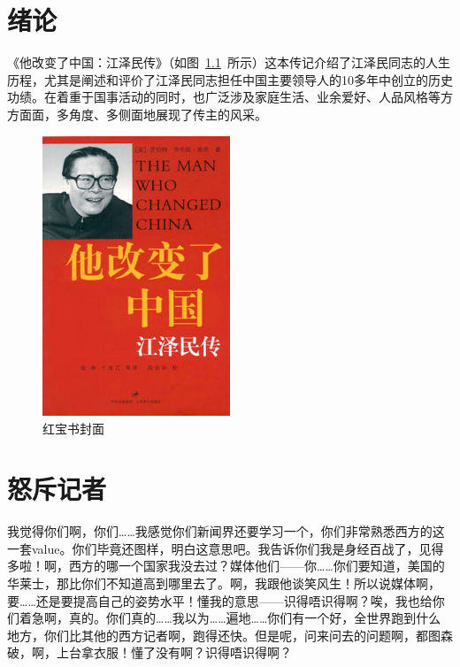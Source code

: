 
\chapter{绪论}
《他改变了中国：江泽民传》（如图~\ref{book}~所示）这本传记介绍了江泽民同志的人生历程，尤其是阐述和评价了江泽民同志担任中国主要领导人的10多年中创立的历史功绩。在着重于国事活动的同时，也广泛涉及家庭生活、业余爱好、人品风格等方方面面，多角度、多侧面地展现了传主的风采。

	\begin{figure}[htbp!]
		\centering
		\includegraphics[width=0.5\textwidth]{figures/The_Man_Who_Changed_China.png}
		\caption{红宝书封面}\label{book}
		\vspace{-1em}
	\end{figure}	



\chapter{怒斥记者}
我觉得你们啊，你们……我感觉你们新闻界还要学习一个，你们非常熟悉西方的这一套value。你们毕竟还图样，明白这意思吧。我告诉你们我是身经百战了，见得多啦！啊，西方的哪一个国家我没去过？媒体他们——你……你们要知道，美国的华莱士，那比你们不知道高到哪里去了。啊，我跟他谈笑风生！所以说媒体啊，要……还是要提高自己的姿势水平！懂我的意思——识得唔识得啊？唉，我也给你们着急啊，真的。你们真的……我以为……遍地……你们有一个好，全世界跑到什么地方，你们比其他的西方记者啊，跑得还快。但是呢，问来问去的问题啊，都图森破，啊，上台拿衣服！懂了没有啊？识得唔识得啊？

